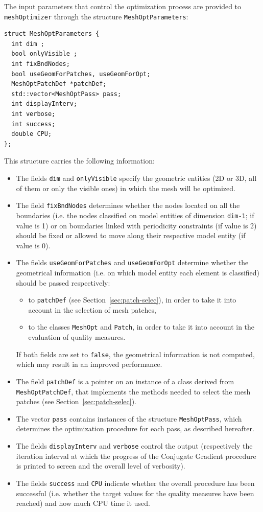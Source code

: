 \documentclass[12pt,a4paper,a4wide]{article}
\begin{document}
The input parameters that control the optimization process are
provided to \texttt{meshOptimizer} through the structure
\texttt{MeshOptParameters}:

\begin{verbatim}
struct MeshOptParameters {
  int dim ;
  bool onlyVisible ;
  int fixBndNodes;
  bool useGeomForPatches, useGeomForOpt;
  MeshOptPatchDef *patchDef;
  std::vector<MeshOptPass> pass;
  int displayInterv;
  int verbose;
  int success;
  double CPU;
};
\end{verbatim}

This structure carries the following information:
\begin{itemize}
\item The fields \texttt{dim} and \texttt{onlyVisible} specify the
geometric entities (2D or 3D, all of them or only the visible ones)
in which the mesh will be optimized.
\item The field \texttt{fixBndNodes} determines whether the nodes
located on all the boundaries (i.e. the nodes classified on model
entities of dimension \texttt{dim-1}; if value is 1) or on boundaries linked
with periodicity constraints (if value is 2)  should be fixed or allowed to
move along their respective model entity (if value is 0).
\item The fields \texttt{useGeomForPatches} and \texttt{useGeomForOpt}
determine whether the geometrical information (i.e. on which model
entity each element is classified) should be passed respectively:
\begin{itemize}
\item to \texttt{patchDef} (see Section~\ref{sec:patch-selec}), in
order to take it into account in the selection of mesh patches,
\item to the classes \texttt{MeshOpt} and \texttt{Patch}, in order
to take it into account in the evaluation of quality measures.
\end{itemize}
If both fields are set to \texttt{false}, the geometrical information
is not computed, which may result in an improved performance.
\item The field \texttt{patchDef} is a pointer on an instance of a
class derived from \texttt{MeshOptPatchDef}, that implements the
methods needed to select the mesh patches (see
Section~\ref{sec:patch-selec}).
\item The vector \texttt{pass} contains instances of the structure
\texttt{MeshOptPass}, which determines the optimization procedure
for each pass, as described hereafter.
\item The fields \texttt{displayInterv} and \texttt{verbose} control
the output (respectively the iteration interval at which the progress
of the Conjugate Gradient procedure is printed to screen and the
overall level of verbosity).
\item The fields \texttt{success} and \texttt{CPU} indicate whether
the overall procedure has been successful (i.e. whether the target
values for the quality measures have been reached) and how much CPU
time it used.
\end{itemize}
\end{document}
